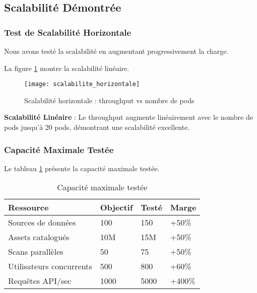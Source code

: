 \subsection{Scalabilité Démontrée}

\subsubsection{Test de Scalabilité Horizontale}

Nous avons testé la scalabilité en augmentant progressivement la charge.

La figure \ref{fig:scalabilite_horizontale} montre la scalabilité linéaire.

\begin{figure}[htpb]
\centering
\texttt{[image: scalabilite\_horizontale]}
\caption{Scalabilité horizontale : throughput vs nombre de pods}
\label{fig:scalabilite_horizontale}
\end{figure}

\textbf{Scalabilité Linéaire} : Le throughput augmente linéairement avec le nombre de pods jusqu'à 20 pods, démontrant une scalabilité excellente.

\subsubsection{Capacité Maximale Testée}

Le tableau \ref{tab:capacite_maximale} présente la capacité maximale testée.

\begin{table}[htpb]
\centering
\caption{Capacité maximale testée}
\label{tab:capacite_maximale}
\begin{tabular}{|p{}|p{}|p{}|p{}|}
\hline
\textbf{Ressource} & \textbf{Objectif} & \textbf{Testé} & \textbf{Marge} \\
\hline
Sources de données & 100 & 150 & +50\% \\
\hline
Assets catalogués & 10M & 15M & +50\% \\
\hline
Scans parallèles & 50 & 75 & +50\% \\
\hline
Utilisateurs concurrents & 500 & 800 & +60\% \\
\hline
Requêtes API/sec & 1000 & 5000 & +400\% \\
\hline
\end{tabular}
\end{table}

